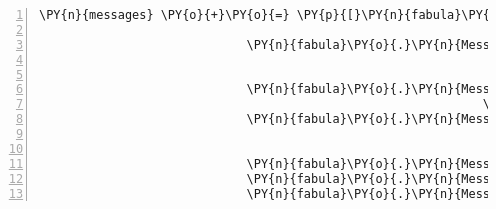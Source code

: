 \begin{Verbatim}[commandchars=\\\{\},numbers=left,firstnumber=1,stepnumber=1]
                \PY{n}{messages} \PY{o}{+}\PY{o}{=} \PY{p}{[}\PY{n}{fabula}\PY{o}{.}\PY{n}{Message}\PY{p}{(}\PY{p}{[}\PY{n}{fabula}\PY{o}{.}\PY{n}{PerceptionEvent}\PY{p}{(}\PY{n}{identifier}\PY{o}{=}\PY{n}{ID\PYZus{}KUNI}\PY{p}{,}
                                                                    \PY{n}{perception}\PY{o}{=}\PY{l+s}{\PYZsq{}}\PY{l+s}{Cassandra gibt dir eine kaputte Laute.}\PY{l+s}{\PYZsq{}}\PY{p}{)}\PY{p}{]}\PY{p}{)}\PY{p}{,}
                             \PY{n}{fabula}\PY{o}{.}\PY{n}{Message}\PY{p}{(}\PY{p}{[}\PY{n}{fabula}\PY{o}{.}\PY{n}{DropsEvent}\PY{p}{(}\PY{n}{ID\PYZus{}CASSANDRA}\PY{p}{,}
                                                               \PY{n+nb+bp}{self}\PY{o}{.}\PY{n}{host}\PY{o}{.}\PY{n}{rack}\PY{o}{.}\PY{n}{entity\PYZus{}dict}\PY{p}{[}\PY{l+s}{\PYZsq{}}\PY{l+s}{lute\PYZus{}broken}\PY{l+s}{\PYZsq{}}\PY{p}{]}\PY{p}{,}
                                                               \PY{n}{room}\PY{o}{.}\PY{n}{entity\PYZus{}locations}\PY{p}{[}\PY{n}{ID\PYZus{}KUNI}\PY{p}{]}\PY{p}{)}\PY{p}{]}\PY{p}{)}\PY{p}{,}
                             \PY{n}{fabula}\PY{o}{.}\PY{n}{Message}\PY{p}{(}\PY{p}{[}\PY{n}{fabula}\PY{o}{.}\PY{n}{SaysEvent}\PY{p}{(}\PY{n}{identifier}\PY{o}{=}\PY{n}{ID\PYZus{}KUNI}\PY{p}{,}
                                                              \PY{n}{text}\PY{o}{=}\PY{l+s}{\PYZsq{}}\PY{l+s}{Moment mal, ich hab da eine Idee!}\PY{l+s}{\PYZsq{}}\PY{p}{)}\PY{p}{]}\PY{p}{)}\PY{p}{,}
                             \PY{n}{fabula}\PY{o}{.}\PY{n}{Message}\PY{p}{(}\PY{p}{[}\PY{n}{fabula}\PY{o}{.}\PY{n}{DropsEvent}\PY{p}{(}\PY{n}{ID\PYZus{}KUNI}\PY{p}{,}
                                                               \PY{n+nb+bp}{self}\PY{o}{.}\PY{n}{host}\PY{o}{.}\PY{n}{rack}\PY{o}{.}\PY{n}{entity\PYZus{}dict}\PY{p}{[}\PY{l+s}{\PYZsq{}}\PY{l+s}{string\PYZus{}harp}\PY{l+s}{\PYZsq{}}\PY{p}{]}\PY{p}{,}
                                                               \PY{n}{room}\PY{o}{.}\PY{n}{entity\PYZus{}locations}\PY{p}{[}\PY{n}{ID\PYZus{}KUNI}\PY{p}{]}\PY{p}{)}\PY{p}{]}\PY{p}{)}\PY{p}{,}
                             \PY{n}{fabula}\PY{o}{.}\PY{n}{Message}\PY{p}{(}\PY{p}{[}\PY{n}{fabula}\PY{o}{.}\PY{n}{DeleteEvent}\PY{p}{(}\PY{n}{identifier}\PY{o}{=}\PY{l+s}{\PYZsq{}}\PY{l+s}{string\PYZus{}harp}\PY{l+s}{\PYZsq{}}\PY{p}{)}\PY{p}{]}\PY{p}{)}\PY{p}{,}
                             \PY{n}{fabula}\PY{o}{.}\PY{n}{Message}\PY{p}{(}\PY{p}{[}\PY{n}{fabula}\PY{o}{.}\PY{n}{DeleteEvent}\PY{p}{(}\PY{n}{identifier}\PY{o}{=}\PY{l+s}{\PYZsq{}}\PY{l+s}{lute\PYZus{}broken}\PY{l+s}{\PYZsq{}}\PY{p}{)}\PY{p}{]}\PY{p}{)}\PY{p}{,}
                             \PY{n}{fabula}\PY{o}{.}\PY{n}{Message}\PY{p}{(}\PY{p}{[}\PY{n}{fabula}\PY{o}{.}\PY{n}{SpawnEvent}\PY{p}{(}\PY{n}{fabula}\PY{o}{.}\PY{n}{Entity}\PY{p}{(}\PY{l+s}{\PYZsq{}}\PY{l+s}{lute}\PY{l+s}{\PYZsq{}}\PY{p}{,}

\end{Verbatim}
